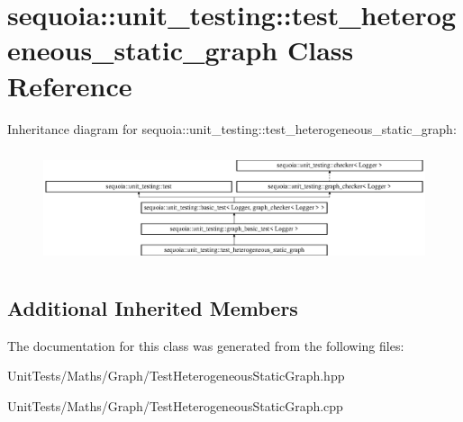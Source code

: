 \hypertarget{classsequoia_1_1unit__testing_1_1test__heterogeneous__static__graph}{}\section{sequoia\+::unit\+\_\+testing\+::test\+\_\+heterogeneous\+\_\+static\+\_\+graph Class Reference}
\label{classsequoia_1_1unit__testing_1_1test__heterogeneous__static__graph}
Inheritance diagram for sequoia\+::unit\+\_\+testing\+::test\+\_\+heterogeneous\+\_\+static\+\_\+graph\+:\begin{figure}[H]
\begin{center}
\leavevmode
\includegraphics[height=3.357314cm]{classsequoia_1_1unit__testing_1_1test__heterogeneous__static__graph}
\end{center}
\end{figure}
\subsection*{Additional Inherited Members}


The documentation for this class was generated from the following files\+:\begin{DoxyCompactItemize}
\item 
Unit\+Tests/\+Maths/\+Graph/Test\+Heterogeneous\+Static\+Graph.\+hpp\item 
Unit\+Tests/\+Maths/\+Graph/Test\+Heterogeneous\+Static\+Graph.\+cpp\end{DoxyCompactItemize}
